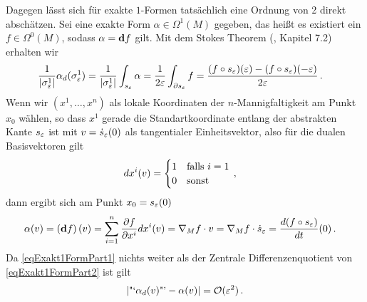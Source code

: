 \begin{bemerkung}
    Dagegen lässt sich für exakte \( 1 \)-Formen tatsächlich eine Ordnung von 2 direkt abschätzen.
    Sei eine exakte Form \( \alpha\in\Omega^{1}(M) \) gegeben, das heißt es existiert ein \( f\in\Omega^{0}(M) \), sodass \( \alpha= \mathbf{d} f \) gilt.
    Mit dem Stokes Theorem (\cite{Marsden}, Kapitel 7.2) erhalten wir
    \begin{align}
    \label{eqExakt1FormPart1}
      \frac{1}{|\sigma^{1}_{\varepsilon}|} \alpha_{d}(\sigma_{\varepsilon}^{1}) &= \frac{1}{|\sigma^{1}_{\varepsilon}|}\int_{s_{\varepsilon}}\alpha 
                                                                   = \frac{1}{2\varepsilon}\int_{\partial s_{\varepsilon}} f
                                                                   = \frac{(f\circ s_{\varepsilon})(\varepsilon) - (f\circ s_{\varepsilon})(-\varepsilon)}{2\varepsilon} \,\text{.}
    \end{align}
    Wenn wir \( \left( x^{1},\ldots,x^{n} \right) \) als lokale Koordinaten der \( n \)-Mannigfaltigkeit am Punkt \( x_{0} \) wählen, 
    so dass \( x^{1} \) gerade die Standartkoordinate entlang der abstrakten Kante \( s_{\varepsilon} \) ist mit \( v=\dot{s}_{\varepsilon}(0) \) als tangentialer Einheitsvektor,
    also für die dualen Basisvektoren gilt 
    \begin{align}
      dx^{i}(v) &= \begin{cases}
                      1 & \text{falls } i=1 \\
                      0 & \text{sonst}
                  \end{cases} \,\text{,}
    \end{align}
    dann ergibt sich am Punkt \( x_{0}= s_{\varepsilon}(0) \)
    \begin{align}
    \label{eqExakt1FormPart2}
      \begin{aligned}
        \alpha(v) &= \left( \mathbf{d} f \right)(v) = \sum_{i=1}^{n}\frac{\partial f}{\partial x^{i}} dx^{i}(v)
                   = \nabla_{M}f \cdot v
                   = \nabla_{M}f \cdot \dot{s}_{\varepsilon}
                   = \frac{d (f\circ s_{\varepsilon})}{dt}(0) \,\text{.}
      \end{aligned}
    \end{align}
    Da \eqref{eqExakt1FormPart1} nichts weiter als der Zentrale Differenzenquotient von \eqref{eqExakt1FormPart2} ist gilt
    \begin{align}
      \left| \text{"`}\alpha_{d}(v)\text{"'} - \alpha(v) \right| = \mathcal{O}(\varepsilon^{2}) \,\text{.}
    \end{align}


\end{bemerkung}
